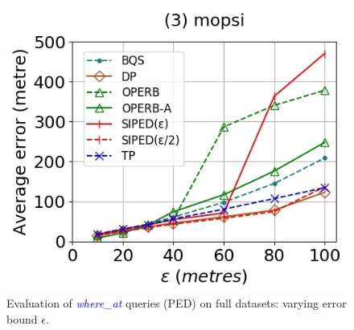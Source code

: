 {\begin{figure}[tb!]
	\includegraphics[scale = 0.25]{Figures/Exp-where-PED-error-epsilon-mopsi.jpg}
	\vspace{-1ex}
	\caption{\small Evaluation of \textcolor{blue}{\emph{where\_at}} queries (PED) on full datasets: varying error bound $\epsilon$.}
	\label{fig:query-ped-epsilon}
	\vspace{-1.0ex}
\end{figure}

}
